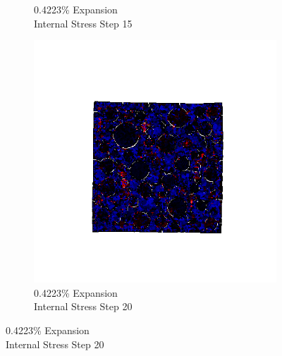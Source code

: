 \begin{figure}[h!]
\begin{subfigure}{.25\textwidth}
      \caption{0.4223\% Expansion\\Internal Stress Step 15}
    \end{subfigure}%
    \begin{subfigure}{.25\textwidth}
      \centering
      \includegraphics[width=1.0\linewidth]{Files/exp_3D/ASR/A30P75_3_stress.png}
      \caption{0.4223\% Expansion\\Internal Stress Step 20}
    \end{subfigure}


\end{figure}

